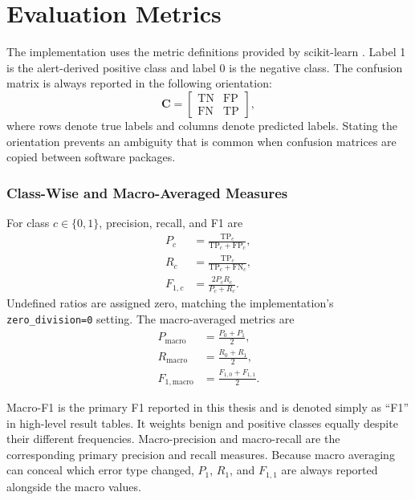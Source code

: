 \documentclass[11pt,fleqn]{report}
\begin{document}
\section{Evaluation Metrics}
\label{subsec:experimental_metrics}

The implementation uses the metric definitions provided by scikit-learn
\cite{Pedregosa2011ScikitLearn}. Label 1 is the alert-derived positive class and
label 0 is the negative class. The confusion matrix is always reported in the
following orientation:
\begin{equation}
    \mathbf{C}=
    \begin{bmatrix}
        \mathrm{TN} & \mathrm{FP}\\
        \mathrm{FN} & \mathrm{TP}
    \end{bmatrix},
    \label{eq:experimental_confusion_matrix}
\end{equation}
where rows denote true labels and columns denote predicted labels. Stating the
orientation prevents an ambiguity that is common when confusion matrices are
copied between software packages.

\subsubsection{Class-Wise and Macro-Averaged Measures}
\label{subsubsec:macro_metrics}

For class $c\in\{0,1\}$, precision, recall, and F1 are
\begin{align}
    P_c &= \frac{\mathrm{TP}_c}
    {\mathrm{TP}_c+\mathrm{FP}_c}, \\
    R_c &= \frac{\mathrm{TP}_c}
    {\mathrm{TP}_c+\mathrm{FN}_c}, \\
    F_{1,c} &= \frac{2P_cR_c}{P_c+R_c}.
    \label{eq:classwise_metrics}
\end{align}
Undefined ratios are assigned zero, matching the implementation's
\texttt{zero\_division=0} setting. The macro-averaged metrics are
\begin{align}
    P_{\mathrm{macro}} &= \frac{P_0+P_1}{2}, \\
    R_{\mathrm{macro}} &= \frac{R_0+R_1}{2}, \\
    F_{1,\mathrm{macro}} &= \frac{F_{1,0}+F_{1,1}}{2}.
    \label{eq:experimental_macro_metrics}
\end{align}

Macro-F1 is the primary F1 reported in this thesis and is denoted simply as
``F1'' in high-level result tables. It weights benign and positive classes
equally despite their different frequencies. Macro-precision and macro-recall
are the corresponding primary precision and recall measures. Because macro
averaging can conceal which error type changed, $P_1$, $R_1$, and $F_{1,1}$
are always reported alongside the macro values.
\end{document}
